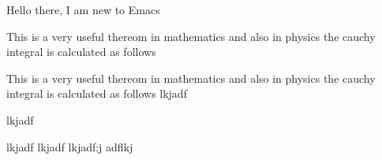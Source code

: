 \documentclass{article}
\begin{document}
Hello there, I am new to Emacs
\begin{theorem}
  This is a very useful thereom in mathematics and also in physics
  the cauchy integral is calculated as follows
\end{theorem}


\begin{definition}[useful]
  This is a very useful thereom in mathematics and also in physics
  the cauchy integral is calculated as follows
  lkjadf
\end{definition}
\begin{definition}
  lkjadf
\end{definition}

lkjadf lkjadf lkjadf;j adflkj 


	
\end{document}
